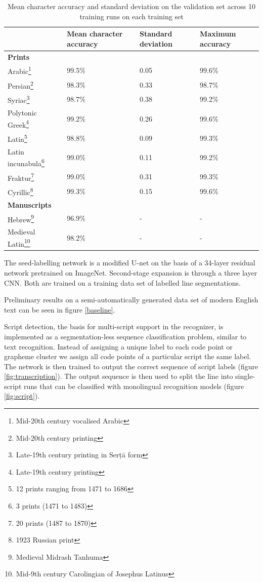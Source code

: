 \begin{table}[ht]
\centering
\begin{minipage}{\columnwidth}
\begin{tabularx}{\columnwidth}{lp{1.7cm}p{1.7cm}p{1.7cm}} \toprule
& \textbf{Mean character accuracy} & \textbf{Standard deviation} & \textbf{Maximum accuracy}\\ \midrule
\addlinespace
\textbf{Prints}\ \\ \midrule
Arabic\footnote{Mid-20th century vocalised Arabic} & 99.5\% & 0.05 & 99.6\%\\
Persian\footnote{Mid-20th century printing} & 98.3\% & 0.33 & 98.7\%\\
Syriac\footnote{Late-19th century printing in Serṭā form}& 98.7\% & 0.38 & 99.2\%\\
Polytonic Greek\footnote{Late-19th century printing}& 99.2\% & 0.26 & 99.6\%\\
Latin\footnote{12 prints ranging from 1471 to 1686} & 98.8\% & 0.09 & 99.3\%\\
Latin incunabula\footnote{3 prints (1471 to 1483)} & 99.0\% & 0.11 & 99.2\%\\
Fraktur\footnote{20 prints (1487 to 1870)} & 99.0\% & 0.31 & 99.3\%\\
Cyrillic\footnote{1923 Russian print}& 99.3\% & 0.15 & 99.6\%\\
\addlinespace
\textbf{Manuscripts}\ \\ \midrule
Hebrew\footnote{Medieval Midrash Tanhuma}& 96.9\% & - & -\\
Medieval Latin\footnote{Mid-9th century Carolingian of Josephus Latinus} & 98.2\% & -  & -\\
\bottomrule
\end{tabularx}
\end{minipage}
\caption{Mean character accuracy and standard deviation on the validation set
	across 10 training runs on each training set}
\label{tab:acc}
\end{table}

The seed-labelling network is a modified U-net \cite{ronneberger2015u} on the
basis of a 34-layer residual network \cite{he2016deep} pretrained on ImageNet.
Second-stage expansion is through a three layer CNN. Both are trained on a
training data set of labelled line segmentations.

Preliminary results on a semi-automatically generated data set of modern
English text can be seen in figure \ref{baseline}.

Script detection, the basis for multi-script support in the recognizer, is
implemented as a segmentation-less sequence classification problem, similar to
text recognition. Instead of assigning a unique label to each code point or
grapheme cluster we assign all code points of a particular script the same
label. The network is then trained to output the correct sequence of script
labels (figure \ref{fig:transcription}). The output sequence is then used
to split the line into single-script runs that can be classified with
monolingual recognition models (figure \ref{fig:script}).

